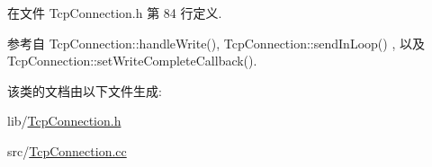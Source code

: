 在文件 Tcp\+Connection.\+h 第 84 行定义.



参考自 Tcp\+Connection\+::handle\+Write(), Tcp\+Connection\+::send\+In\+Loop() , 以及 Tcp\+Connection\+::set\+Write\+Complete\+Callback().



该类的文档由以下文件生成\+:\begin{DoxyCompactItemize}
\item 
lib/\hyperlink{TcpConnection_8h}{Tcp\+Connection.\+h}\item 
src/\hyperlink{TcpConnection_8cc}{Tcp\+Connection.\+cc}\end{DoxyCompactItemize}

